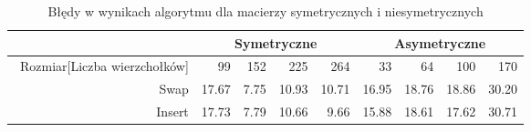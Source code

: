 \begin{table}
\begin{tabular}{|r|r|r|r|r|r|r|r|r|}
\hline
 & \multicolumn{4}{|c|}{Symetryczne} & \multicolumn{4}{|c|}{Asymetryczne} \\ \hline\
Rozmiar[Liczba wierzchołków] & 99 & 152 & 225 & 264 & 33 & 64 & 100 & 170 \\ \hline
Swap & 17.67 & 7.75 & 10.93 & 10.71 & 16.95 & 18.76 & 18.86 & 30.20 \\
Insert & 17.73 & 7.79 & 10.66 & 9.66 & 15.88 & 18.61 & 17.62 & 30.71 \\ \hline
\end{tabular}
\caption{Błędy w wynikach algorytmu dla macierzy symetrycznych i niesymetrycznych}
\label{tab:error_TsNeighMet}
\end{table}
